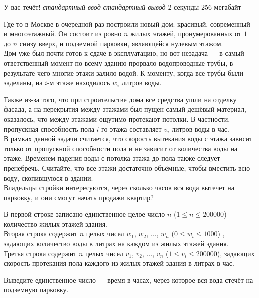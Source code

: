 \begin{problem}%
{У вас течёт!}%
{\textsl{стандартный ввод}}%
{\textsl{стандартный вывод}}%
{2 секунды}%
{256 мегабайт}%
{}

Где-то в Москве в очередной раз построили новый дом: красивый, современный и многоэтажный. Он состоит из ровно $n$ жилых этажей, пронумерованных от $1$ до $n$ снизу вверх, и подземной парковки, являющейся нулевым этажом.\\

Дом уже был почти готов к сдаче в эксплуатацию, но вот незадача — в самый ответственный момент по всему зданию прорвало водопроводные трубы, в результате чего многие этажи залило водой. К моменту, когда все трубы были заделаны, на $i$-м этаже находилось $w_i$ литров воды.\

Также из-за того, что при строительстве дома все средства ушли на отделку фасада, а на перекрытия между этажами был пущен самый дешёвый материал, оказалось, что между этажами ощутимо протекают потолки. В частности, пропускная способность пола $i$-го этажа составляет $v_i$ литров воды в час.\\

В рамках данной задачи считается, что скорость вытекания воды с этажа зависит только от пропускной способности пола и не зависит от количества воды на этаже. Временем падения воды с потолка этажа до пола также следует пренебречь. Считайте, что все этажи достаточно объёмные, чтобы вместить всю воду, скопившуюся в здании.\\

Владельцы стройки интересуются, через сколько часов вся вода вытечет на парковку, и они смогут начать продажи квартир?

\InputFile

В первой строке записано единственное целое число $n$ ($1 \le n \le 200000$) — количество жилых этажей здания.\\

Вторая строка содержит $n$ целых чисел $w_1$, $w_2$, ..., $w_n$ ($0 \le w_i \le 1000$) , задающих количество воды в литрах на каждом из жилых этажей здания.\\

Третья строка содержит $n$ целых чисел $v_1$, $v_2$, ..., $v_n$ ($1 \le v_i \le 200000$), задающих скорость протекания пола каждого из жилых этажей здания в литрах в час.

\OutputFile

Выведите единственное число — время в часах, через которое вся вода стечёт на подземную парковку.\\


\end{problem}

